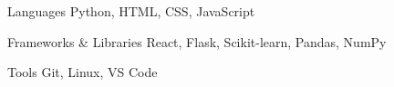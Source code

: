 
\begin{cvskills}

  \cvskill
    {Languages} %
    {Python, HTML, CSS, JavaScript}

  \cvskill
    {Frameworks \& Libraries} %
    {React, Flask, Scikit-learn, Pandas, NumPy}

  \cvskill
    {Tools} %
    {Git, Linux, VS Code}

\end{cvskills}
